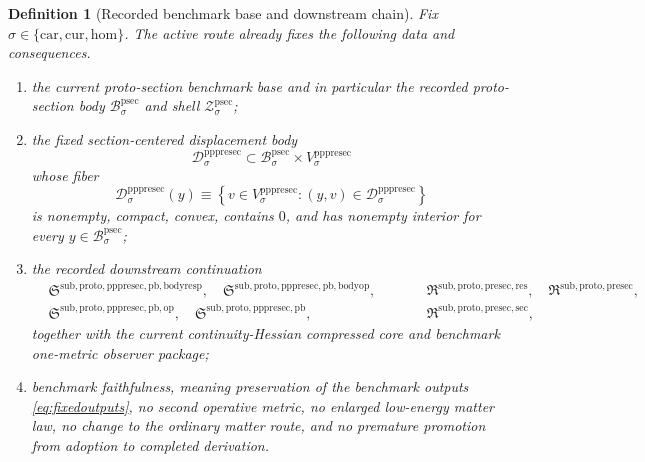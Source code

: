 \documentclass[11pt]{article}
\newcommand{\Car}{\mathrm{car}}
\newcommand{\Cur}{\mathrm{cur}}
\newcommand{\Hom}{\mathrm{hom}}
\newcommand{\ProtoSectionBody}[1]{\mathcal B_{#1}^{\mathrm{psec}}}
\newcommand{\ProtoSectionShell}[1]{\mathcal Z_{#1}^{\mathrm{psec}}}
\newcommand{\PrePreProtoSectionVertical}[1]{V_{#1}^{\mathrm{pppresec}}}
\newcommand{\PrePreProtoSectionResidualBody}[1]{\mathcal D_{#1}^{\mathrm{pppresec}}}
\newcommand{\PullbackBodyResponseCore}{\mathfrak S^{\mathrm{sub,proto,pppresec,pb,bodyresp}}}
\newcommand{\PullbackBodyOperatorCore}{\mathfrak S^{\mathrm{sub,proto,pppresec,pb,bodyop}}}
\newcommand{\PullbackOperatorCore}{\mathfrak S^{\mathrm{sub,proto,pppresec,pb,op}}}
\newcommand{\PrePreProtoSectionPullbackCore}{\mathfrak S^{\mathrm{sub,proto,pppresec,pb}}}
\newcommand{\PreProtoSectionResidualPackage}{\mathfrak R^{\mathrm{sub,proto,presec,res}}}
\newcommand{\PreProtoSectionPackage}{\mathfrak R^{\mathrm{sub,proto,presec}}}
\newcommand{\PreProtoSectionMinSectionCore}{\mathfrak R^{\mathrm{sub,proto,presec,sec}}}
\newtheorem{definition}{Definition}
\begin{document}
\begin{definition}[Recorded benchmark base and downstream chain]
\label{def:route}
Fix \(\sigma\in\{\Car,\Cur,\Hom\}\). The active route already fixes the following data and consequences.
\begin{enumerate}
    \item the current proto-section benchmark base and in particular the recorded proto-section body \(\ProtoSectionBody{\sigma}\) and shell \(\ProtoSectionShell{\sigma}\);
    \item the fixed section-centered displacement body
    \[
    \PrePreProtoSectionResidualBody{\sigma}
    \subset
    \ProtoSectionBody{\sigma}\times\PrePreProtoSectionVertical{\sigma}
    \]
    whose fiber
    \[
    \PrePreProtoSectionResidualBody{\sigma}(y)
    \equiv
    \left\{
    v\in\PrePreProtoSectionVertical{\sigma}:(y,v)\in\PrePreProtoSectionResidualBody{\sigma}
    \right\}
    \]
    is nonempty, compact, convex, contains \(0\), and has nonempty interior for every \(y\in\ProtoSectionBody{\sigma}\);
    \item the recorded downstream continuation
    \[
    \begin{aligned}
    &\PullbackBodyResponseCore,\quad
    \PullbackBodyOperatorCore,\\
    &\PullbackOperatorCore,\quad
    \PrePreProtoSectionPullbackCore,
    \end{aligned}
    \qquad
    \begin{aligned}
    &\PreProtoSectionResidualPackage,\quad
    \PreProtoSectionPackage,\\
    &\PreProtoSectionMinSectionCore,
    \end{aligned}
    \]
    together with the current continuity-Hessian compressed core and benchmark one-metric observer package;
    \item benchmark faithfulness, meaning preservation of the benchmark outputs \eqref{eq:fixedoutputs}, no second operative metric, no enlarged low-energy matter law, no change to the ordinary matter route, and no premature promotion from adoption to completed derivation.
\end{enumerate}
\end{definition}
\end{document}
